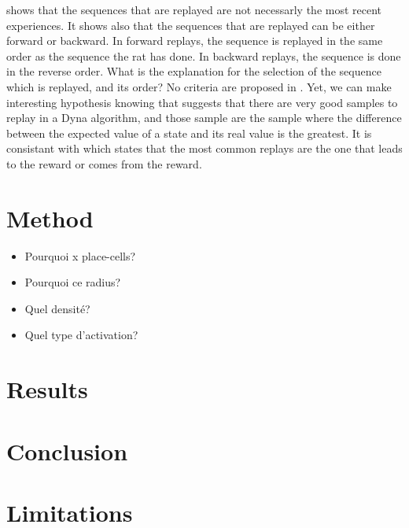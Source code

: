 \documentclass[]{article}
\begin{document}
\textcite{gupta_hippocampal_2010} shows that the sequences that are replayed are not necessarly the most recent experiences. It shows also that the sequences that are replayed can be either forward or backward. In forward replays, the sequence is replayed in the same order as the sequence the rat has done. In backward replays, the sequence is done in the reverse order. What is the explanation for the selection of the sequence which is replayed, and its order? No criteria are proposed in \textcite{gupta_hippocampal_2010}. Yet, we can make interesting hypothesis knowing that \textcite{sutton_dyna-style_2012} suggests that there are very good samples to replay in a Dyna algorithm, and those sample are the sample where the difference between the expected value of a state and its real value is the greatest. It is consistant with \textcite{gupta_hippocampal_2010} which states that the most common replays are the one that leads to the reward or comes from the reward.

\section{Method}\label{method}
\begin{itemize}
  \item Pourquoi x place-cells?
  \item Pourquoi ce radius?
  \item Quel densité?
  \item Quel type d'activation?
\end{itemize}
\section{Results}\label{results}

\section{Conclusion}\label{conclusion}

\section{Limitations}\label{limitations}


\printbibliography{}
\end{document}
